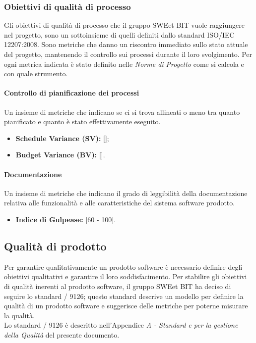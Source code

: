 \subsubsection{Obiettivi di qualità di processo}  
Gli obiettivi di qualità di processo che il gruppo SWEet BIT vuole raggiungere nel progetto, sono un sottoinsieme di quelli definiti dallo standard ISO/IEC 12207:2008.
Sono metriche che danno un riscontro immediato sullo stato attuale del progetto, mantenendo il controllo sui processi durante il loro svolgimento.
Per ogni metrica indicata è stato definito nelle \emph{Norme di Progetto}\VersioneNP{} come si calcola e con quale strumento.

\paragraph{Controllo di pianificazione dei processi}
Un insieme di metriche che indicano se ci si trova allineati o meno tra quanto pianificato e quanto è stato effettivamente eseguito.
\begin{itemize}
\item \textbf{Schedule Variance (SV): }[];
\item \textbf{Budget Variance (BV): }[].
\end{itemize}

\paragraph{Documentazione}
Un insieme di metriche che indicano il grado di leggibilità della documentazione relativa alle funzionalità e alle caratteristiche del sistema software prodotto.
\begin{itemize}
\item \textbf{Indice di Gulpease: }[60 - 100].
\end{itemize}

\subsection{Qualità di prodotto}
    Per garantire qualitativamente un prodotto software è necessario definire
    degli obiettivi qualitativi e garantire il loro soddisfacimento. Per
    stabilire gli obiettivi di qualità inerenti al prodotto software, il gruppo
    SWEet BIT ha deciso di seguire lo standard / 9126; questo standard
    descrive un modello per definire la qualità di un prodotto software e
    suggerisce delle metriche per poterne misurare la qualità.\\
    Lo standard / 9126 è descritto nell'Appendice \emph{A - Standard e
     per la gestione della Qualità} del presente documento.

